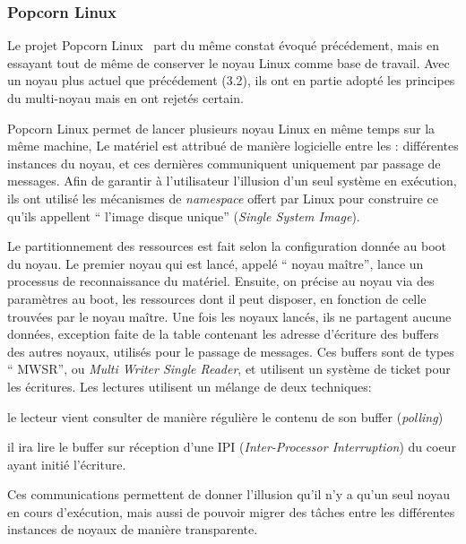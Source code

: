       
    \subsubsection{Popcorn Linux}

      Le projet Popcorn Linux~\citep{barbalacepopcorn} part du même constat
      évoqué précédement, mais en essayant tout de même de conserver le noyau
      Linux comme base de travail. Avec un noyau plus actuel que précédement
      (3.2), ils ont en partie adopté les principes du multi-noyau mais en ont
      rejetés certain.

      Popcorn Linux permet de lancer plusieurs noyau Linux en même temps sur la
      même machine, Le matériel est attribué de manière logicielle entre les :
      différentes instances du noyau, et ces dernières communiquent uniquement
      par passage de messages. Afin de garantir à l’utilisateur l’illusion d’un
      seul système en exécution, ils ont utilisé les mécanismes de
      \textit{namespace} offert par Linux pour construire ce qu’ils appellent ``
      l’image disque unique'' (\textit{Single System Image}).

      Le partitionnement des ressources est fait selon la configuration donnée
      au boot du noyau. Le premier noyau qui est lancé, appelé `` noyau
      maître'', lance un processus de reconnaissance du matériel. Ensuite, on
      précise au noyau via des paramètres au boot, les ressources dont il peut
      disposer, en fonction de celle trouvées par le noyau maître. Une fois les
      noyaux lancés, ils ne partagent aucune données, exception faite de la
      table contenant les adresse d’écriture des buffers des autres noyaux,
      utilisés pour le passage de messages. Ces buffers sont de types `` MWSR'',
      ou \textit{Multi Writer Single Reader}, et utilisent un système de ticket
      pour les écritures. Les lectures utilisent un mélange de deux
      techniques:\benumline \item le lecteur vient consulter de manière
      régulière le contenu de son buffer (\textit{polling}) \item il ira lire le
      buffer sur réception d’une IPI (\textit{Inter-Processor Interruption}) du
      coeur ayant initié l’écriture\eenumline.

      Ces communications permettent de donner l’illusion qu’il n’y a qu’un seul
      noyau en cours d’exécution, mais aussi de pouvoir migrer des tâches entre
      les différentes instances de noyaux de manière transparente.

